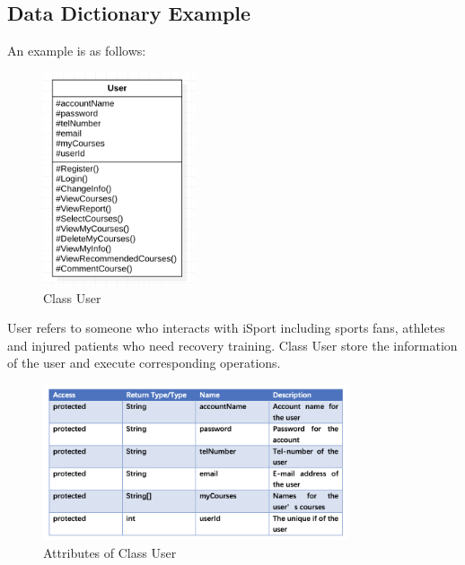 \documentclass[16pt]{scrreprt}
\begin{document}
\subsection{Data Dictionary Example}
\noindent An example is as follows:
\begin{figure}[H]
    \centering
    \includegraphics[width=0.4\textwidth]{figures/classUser.png}
    \caption{Class User}
\end{figure}
\noindent User refers to someone who interacts with iSport including sports fans, athletes and injured patients who need recovery training. Class User store the information of the user and execute corresponding operations.
\begin{figure}[H]
    \centering
    \includegraphics[width=0.8\textwidth]{figures/attributes.png}
    \caption{Attributes of Class User}
\end{figure}
\end{document}
